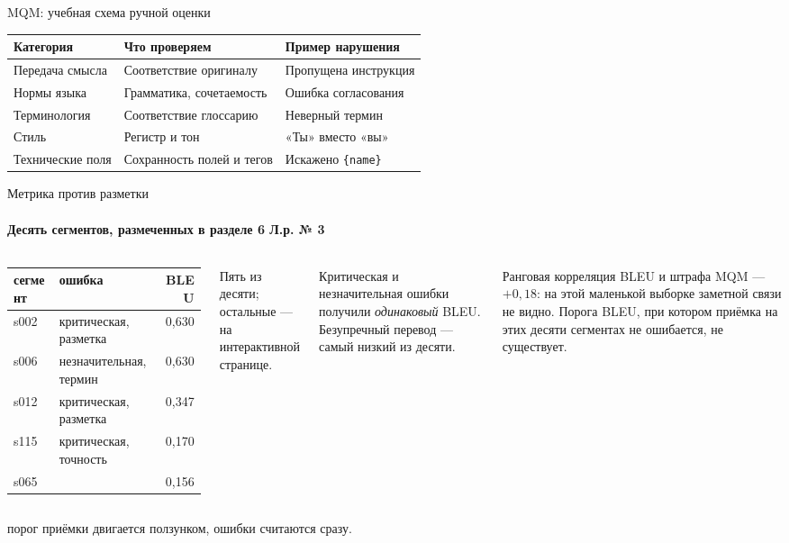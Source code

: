 \documentclass[aspectratio=169,12pt]{beamer}
\newcommand{\пр}{\kern0.04em\vrule height0.45ex depth0pt width0.06em%
  \vrule height0.06em depth0pt width0.42em\vrule height0.45ex depth0pt width0.06em\kern0.04em}
\newcommand{\формула}[1]{\par\vspace{0.25em}{\centering$\displaystyle #1$\par}\vspace{0.25em}}
\newcommand{\блок}[3]{%
  \vspace{1.4cm}
  {\color{brick}\small\bfseries БЛОК #1\par}
  \vspace{0.6cm}
  {\color{navy}\fontsize{28}{32}\selectfont\bfseries #2\par}
  \vspace{0.6cm}
  {\color{ink}\large #3\par}}
\begin{document}
\begin{frame}{MQM: учебная схема ручной оценки}
\color{ink}
{\small
\begin{tabular}{@{}Л{.25}Л{.34}Л{.32}@{}}\toprule
Категория & Что проверяем & Пример нарушения\\\midrule
Передача смысла & Соответствие оригиналу & Пропущена инструкция\\[.2em]
Нормы языка & Грамматика, сочетаемость & Ошибка согласования\\[.2em]
Терминология & Соответствие глоссарию & Неверный термин\\[.2em]
Стиль & Регистр и тон & «Ты» вместо «вы»\\[.2em]
Технические поля & Сохранность полей и тегов & Искажено \texttt{\{name\}}\\
\bottomrule\end{tabular}}
\end{frame}

\begin{frame}{Метрика против разметки}
\color{ink}
  \framesubtitle{Десять сегментов, размеченных в разделе 6 Л.р. № 3}
  \begin{columns}[T,onlytextwidth]
      {\small
      \begin{tabular}{@{}llr@{}}
        \toprule
        сегмент & ошибка & BLEU \\
        \midrule
        s002 & критическая, разметка     & 0,630 \\
        s006 & незначительная, термин    & 0,630 \\
        s012 & критическая, разметка     & 0,347 \\
        s115 & критическая, точность     & 0,170 \\
        s065 & \leavevmode{}{нет}                & 0,156 \\
        \bottomrule
      \end{tabular}}

      \vspace{0.3em}
      {\footnotesize\color{ash} Пять из десяти; остальные — на
      интерактивной странице.}
      {\small
      Критическая и незначительная ошибки получили \emph{одинаковый}
      BLEU. Безупречный перевод — самый низкий из десяти.\par
      \vspace{0.5em}
      Ранговая корреляция BLEU и штрафа MQM — $+0{,}18$: на этой маленькой выборке заметной связи не видно. Порога BLEU, при котором приёмка на этих десяти
      сегментах не ошибается, не существует.}
  \end{columns}

  {порог приёмки двигается ползунком, ошибки считаются сразу.}
\end{frame}
\end{document}
